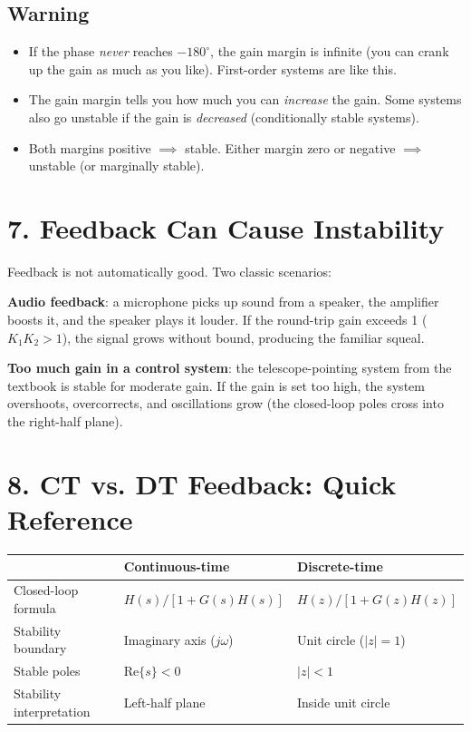 \documentclass[11pt]{article}
\begin{document}
\subsection*{Warning}
\begin{itemize}
  \item If the phase \textit{never} reaches $-180^\circ$, the gain margin is infinite (you can crank up the gain as much as you like). First-order systems are like this.
  \item The gain margin tells you how much you can \textit{increase} the gain. Some systems also go unstable if the gain is \textit{decreased} (conditionally stable systems).
  \item Both margins positive $\implies$ stable. Either margin zero or negative $\implies$ unstable (or marginally stable).
\end{itemize}

\section*{7. Feedback Can Cause Instability}

Feedback is not automatically good. Two classic scenarios:

\textbf{Audio feedback}: a microphone picks up sound from a speaker, the amplifier boosts it, and the speaker plays it louder. If the round-trip gain exceeds 1 ($K_1 K_2 > 1$), the signal grows without bound, producing the familiar squeal.

\textbf{Too much gain in a control system}: the telescope-pointing system from the textbook is stable for moderate gain. If the gain is set too high, the system overshoots, overcorrects, and oscillations grow (the closed-loop poles cross into the right-half plane).

\section*{8. CT vs. DT Feedback: Quick Reference}

\begin{center}
\begin{tabular}{|l|l|l|}
\hline
\textbf{} & \textbf{Continuous-time} & \textbf{Discrete-time} \\
\hline
Closed-loop formula & $H(s)/[1 + G(s)H(s)]$ & $H(z)/[1 + G(z)H(z)]$ \\
\hline
Stability boundary & Imaginary axis ($j\omega$) & Unit circle ($\lvert z \rvert = 1$) \\
\hline
Stable poles & $\mathrm{Re}\{s\} < 0$ & $\lvert z \rvert < 1$ \\
\hline
Stability interpretation & Left-half plane & Inside unit circle \\
\hline
\end{tabular}
\end{center}
\end{document}
